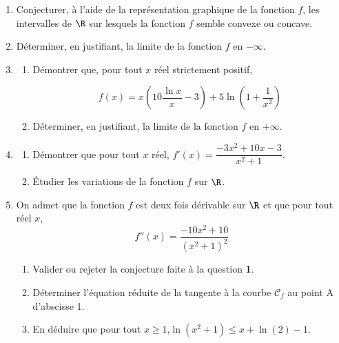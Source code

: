 \begin{enumerate}
\item Conjecturer, à l'aide de la représentation graphique de la fonction $f$, les intervalles de $\R$ sur lesquels la fonction $f$ semble convexe ou concave.
\item Déterminer, en justifiant, la limite de la fonction $f$ en $-\infty$.
\item
	\begin{enumerate}
		\item Démontrer que, pour tout $x$ réel strictement positif,

\[f(x)=x\left(10 \dfrac{\ln x}{x}-3\right)+5 \ln \left(1+\dfrac{1}{x^{2}}\right)\]

		\item Déterminer, en justifiant, la limite de la fonction $f$ en $+\infty$.\end{enumerate}
\item
	\begin{enumerate}
		\item Démontrer que pour tout $x$ réel, \quad $f'(x)= \dfrac{-3 x^{2}+10 x-3}{x^{2}+1}$.
		\item Étudier les variations de la fonction $f$ sur $\R$.
	\end{enumerate}
	\item On admet que la fonction $f$ est deux fois dérivable sur $\R$ et que pour tout réel $x$,
	\[f''(x)=\dfrac{-10 x^{2}+10}{\left(x^{2}+1\right)^{2}}\]

	\begin{enumerate}
		\item Valider ou rejeter la conjecture faite à la question \textbf{1}.
		\item Déterminer l'équation réduite de la tangente à la courbe $\mathcal{C}_{f}$ au point A d'abscisse 1.
		\item En déduire que pour tout $x \geqslant 1$,\quad $\ln \left(x^{2}+1\right) \leqslant x+\ln (2)-1$.
	\end{enumerate}
	\end{enumerate}
